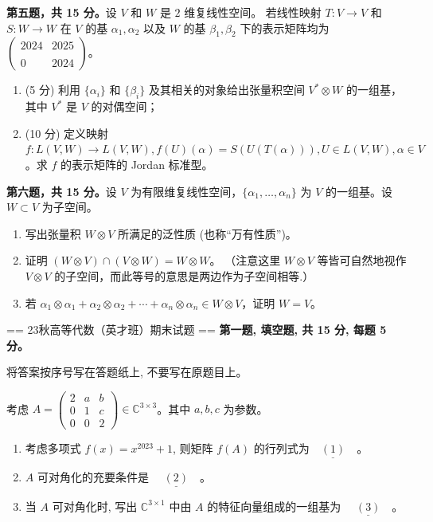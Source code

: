 \textbf{第五题，共 15 分。}设 $V$ 和 $W$ 是 $2$ 维复线性空间。
若线性映射 $T: V \rightarrow V$ 和 $S: W \rightarrow W$ 
在 $V$ 的基 $\alpha_{1}, \alpha_{2}$ 以及 $W$ 的基 $\beta_{1}, \beta_{2}$ 下的表示矩阵均为 
$\begin{pmatrix}2024 & 2025 \\ \\ 0 & 2024\end{pmatrix}$。
\begin{enumerate}
\item (5 分) 利用 $\{\alpha_{i}\}$ 和 $\{\beta_{i}\}$ 及其相关的对象给出张量积空间 $V^{*} \otimes W$ 的一组基，其中 $V^{*}$ 是 $V$ 的对偶空间；
\item (10 分) 定义映射 $f: L(V, W) \rightarrow L(V, W), f(U)(\alpha)=S(U(T(\alpha))), U \in L(V, W), \alpha \in V$。求 $f$ 的表示矩阵的 Jordan 标准型。
\end{enumerate}
\textbf{第六题，共 15 分。}设 $V$ 为有限维复线性空间，$\{\alpha_{1}, \ldots, \alpha_{n}\}$ 为 $V$ 的一组基。设 $W \subset V$ 为子空间。
\begin{enumerate}
\item 写出张量积 $W \otimes V$ 所满足的泛性质 (也称``万有性质'')。
\item 证明 $(W \otimes V) \cap (V \otimes W)=W \otimes W$。
（注意这里 $W \otimes V$ 等皆可自然地视作 $V \otimes V$ 的子空间，而此等号的意思是两边作为子空间相等.）
\item 若 $\alpha_{1} \otimes \alpha_{1}+\alpha_{2} \otimes \alpha_{2}+\cdots+\alpha_{n} \otimes \alpha_{n} \in W \otimes V$，证明 $W=V$。
\end{enumerate}

== 23秋高等代数（英才班）期末试题 ==
\textbf{第一题, 填空题, 共 15 分, 每题 5 分。}

将答案按序号写在答题纸上, 不要写在原题目上。

考虑 $A=\begin{pmatrix}2 & a & b \\ 0 & 1 & c \\ 0 & 0 & 2\end{pmatrix} \in \mathbb{C}^{3 \times 3}$。其中 $a, b, c$ 为参数。

\begin{enumerate}
  \item 考虑多项式 $f(x)=x^{2023}+1$, 则矩阵 $f(A)$ 的行列式为$\underline{\quad(1)\quad} 。$
  \item $A$ 可对角化的充要条件是 $\underline{\quad(2)\quad} 。$
  \item 当 $A$ 可对角化时, 写出 $\mathbb{C}^{3 \times 1}$ 中由 $A$ 的特征向量组成的一组基为 $\underline{\quad(3)\quad} 。$
\end{enumerate}

